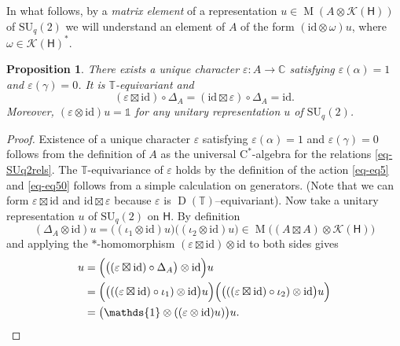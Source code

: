 \documentclass[12pt,reqno,a4paper]{amsart}
\newtheorem{proposition}{Proposition}[section]
\theoremstyle{definition}
\newcommand{\cst}{\ensuremath{\mathrm{C}^*}}
\newcommand{\comp}{\circ}
\newcommand{\eps}{\varepsilon}
\newcommand{\I}{\mathds{1}}
\newcommand{\id}{\mathrm{id}}
\newcommand{\tens}{\otimes}
\newcommand{\CC}{\mathbb{C}}
\newcommand{\TT}{\mathbb{T}}
\newcommand{\cK}{\mathscr{K}}
\newcommand{\sH}{\mathsf{H}}
\DeclareMathOperator{\D}{D}
\DeclareMathOperator{\M}{M}
\newcommand{\SU}{\mathrm{SU}}
\numberwithin{equation}{section}
\begin{document}
In what follows, by a \emph{matrix element} of a representation $u\in\M(A\tens\cK(\sH))$ of $\SU_q(2)$ we will understand an element of $A$ of the form $(\id\tens\omega)u$, where $\omega\in\cK(\sH)^*$.

\begin{proposition}\label{prop-lemma19}
There exists a unique character $\eps\colon A\to\CC$ satisfying $\eps(\alpha)=1$ and $\eps(\gamma)=0$. It is $\TT$-equivariant and
\begin{equation}\label{eq-eq50}
(\eps\boxtimes\id)\comp\Delta_A=(\id\boxtimes\eps)\comp\Delta_A=\id.
\end{equation}
Moreover, $(\eps\tens\id)u=\I$ for any unitary representation $u$ of $\SU_q(2)$.
\end{proposition}


\begin{proof}
Existence of a unique character $\eps$ satisfying $\eps(\alpha)=1$ and $\eps(\gamma)=0$ follows from the definition of $A$ as the universal \cst-algebra for the relations \eqref{eq-SUq2rels}. The $\TT$-equivariance of $\eps$ holds by the definition of the action \eqref{eq-eq5} and \eqref{eq-eq50} follows from a simple calculation on generators. (Note that we can form $\eps\boxtimes\id$ and $\id\boxtimes\eps$ because $\eps$ is $\D(\TT)$--equivariant). Now take a unitary representation $u$ of $\SU_q(2)$ on $\sH$. By definition
\[
(\Delta_A\tens\id)u=\bigl((\iota_1\tens\id)u\bigr)\bigl((\iota_2\tens\id)u\bigr)
\in\M\bigl((A\boxtimes A)\tens\cK(\sH)\bigr)
\]
and applying the $*$-homomorphism $(\eps\boxtimes\id)\tens\id$ to both sides gives
\begin{align*}
u&=\Bigl(\bigl((\eps\boxtimes\id)\comp\Delta_A\bigr)\tens\id\Bigr)u\\
&=\Bigl(\bigl(((\eps\boxtimes\id)\comp\iota_1)\tens\id\bigr)u\Bigr)
\Bigl(\bigl(((\eps\boxtimes\id)\comp\iota_2)\tens\id\bigr)u\Bigr)\\
&=\bigl(\I\tens((\eps\tens\id)u)\bigr)u.\qedhere
\end{align*}
\end{proof}
\end{document}
